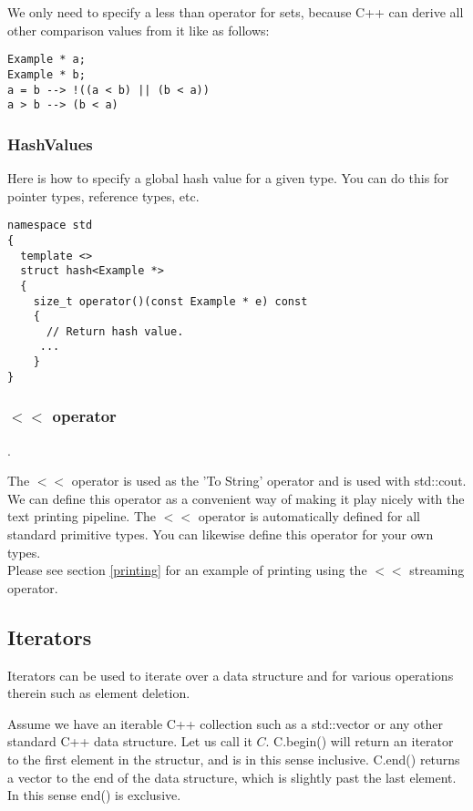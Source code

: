 \documentclass[12pt, letterpaper]{article}
\begin{document}
We only need to specify a less than operator for sets, because C++ can derive all other comparison values from it like as follows:
\begin{verbatim}
Example * a;
Example * b;
a = b --> !((a < b) || (b < a))
a > b --> (b < a)
\end{verbatim}


\subsubsection{HashValues}

Here is how to specify a global hash value for a given type. You can do this for pointer types, reference types, etc.

\begin{verbatim}
namespace std
{
  template <>
  struct hash<Example *>
  {
    size_t operator()(const Example * e) const
    {
      // Return hash value.
     ...
    }
}
\end{verbatim}

\subsubsection{$<<$ operator} \label{stream_operator}.

The $<<$ operator is used as the 'To String' operator and is used with std::cout. We can define this operator as a convenient way of making it play nicely with the text printing pipeline. The $<<$ operator is automatically defined for all standard primitive types. You can likewise define this operator for your own types.
\\
Please see section \ref{printing} for an example of printing using the $<<$ streaming operator.

\newpage
\subsection{Iterators}

Iterators can be used to iterate over a data structure and for various operations therein such as element deletion.

Assume we have an iterable C++ collection such as a std::vector or any other standard C++ data structure. Let us call it $C$.
C.begin() will return an iterator to the first element in the structur, and is in this sense inclusive. C.end() returns a vector to the end of the data structure, which is slightly past the last element. In this sense end() is exclusive.
\end{document}

